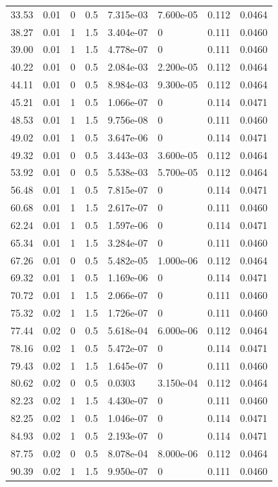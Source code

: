 \documentclass[preview]{standalone}
\begin{document}
{{\begin{tabular}{L{1.2cm}C{1.2cm} C{0.3cm}C{0.5cm} C{1.4cm}C{1.4cm} C{1.4cm}C{1.4cm}}
  33.53  &  0.01  & 0     & 0.5 &  7.315e-03  & 7.600e-05  & 0.112 &  0.0464   \\ 
  38.27  &  0.01  & 1     & 1.5 &  3.404e-07  & 0  & 0.111 &  0.0460   \\ 
  39.00  &  0.01  & 1     & 1.5 &  4.778e-07  & 0  & 0.111 &  0.0460   \\ 
  40.22  &  0.01  & 0     & 0.5 &  2.084e-03  & 2.200e-05  & 0.112 &  0.0464   \\ 
  44.11  &  0.01  & 0     & 0.5 &  8.984e-03  & 9.300e-05  & 0.112 &  0.0464   \\ 
  45.21  &  0.01  & 1     & 0.5 &  1.066e-07  & 0  & 0.114 &  0.0471   \\ 
  48.53  &  0.01  & 1     & 1.5 &  9.756e-08  & 0  & 0.111 &  0.0460   \\ 
  49.02  &  0.01  & 1     & 0.5 &  3.647e-06  & 0  & 0.114 &  0.0471   \\ 
  49.32  &  0.01  & 0     & 0.5 &  3.443e-03  & 3.600e-05  & 0.112 &  0.0464   \\ 
  53.92  &  0.01  & 0     & 0.5 &  5.538e-03  & 5.700e-05  & 0.112 &  0.0464   \\ 
  56.48  &  0.01  & 1     & 0.5 &  7.815e-07  & 0  & 0.114 &  0.0471   \\ 
  60.68  &  0.01  & 1     & 1.5 &  2.617e-07  & 0  & 0.111 &  0.0460   \\ 
  62.24  &  0.01  & 1     & 0.5 &  1.597e-06  & 0  & 0.114 &  0.0471   \\ 
  65.34  &  0.01  & 1     & 1.5 &  3.284e-07  & 0  & 0.111 &  0.0460   \\ 
  67.26  &  0.01  & 0     & 0.5 &  5.482e-05  & 1.000e-06  & 0.112 &  0.0464   \\ 
  69.32  &  0.01  & 1     & 0.5 &  1.169e-06  & 0  & 0.114 &  0.0471   \\ 
  70.72  &  0.01  & 1     & 1.5 &  2.066e-07  & 0  & 0.111 &  0.0460   \\ 
  75.32  &  0.02  & 1     & 1.5 &  1.726e-07  & 0  & 0.111 &  0.0460   \\ 
  77.44  &  0.02  & 0     & 0.5 &  5.618e-04  & 6.000e-06  & 0.112 &  0.0464   \\ 
  78.16  &  0.02  & 1     & 0.5 &  5.472e-07  & 0  & 0.114 &  0.0471   \\ 
  79.43  &  0.02  & 1     & 1.5 &  1.645e-07  & 0  & 0.111 &  0.0460   \\ 
  80.62  &  0.02  & 0     & 0.5 &  0.0303  & 3.150e-04  & 0.112 &  0.0464   \\ 
  82.23  &  0.02  & 1     & 1.5 &  4.430e-07  & 0  & 0.111 &  0.0460   \\ 
  82.25  &  0.02  & 1     & 0.5 &  1.046e-07  & 0  & 0.114 &  0.0471   \\ 
  84.93  &  0.02  & 1     & 0.5 &  2.193e-07  & 0  & 0.114 &  0.0471   \\ 
  87.75  &  0.02  & 0     & 0.5 &  8.078e-04  & 8.000e-06  & 0.112 &  0.0464   \\ 
  90.39  &  0.02  & 1     & 1.5 &  9.950e-07  & 0  & 0.111 &  0.0460   \\ 
\hline 
\end{tabular} 

}}
\end{document}
